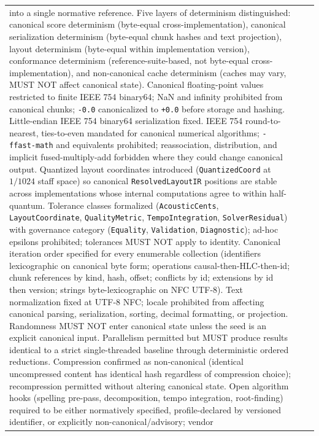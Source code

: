 \documentclass[11pt,letterpaper]{report}
\begin{document}
\begin{longtable}{p{2cm} p{2.5cm} p{9cm}}
  into a single normative reference. Five layers of determinism
  distinguished: canonical score determinism (byte-equal
  cross-implementation), canonical serialization determinism
  (byte-equal chunk hashes and text projection), layout
  determinism (byte-equal within implementation version),
  conformance determinism (reference-suite-based, not byte-equal
  cross-implementation), and non-canonical cache determinism
  (caches may vary, MUST NOT affect canonical state). Canonical
  floating-point values restricted to finite IEEE 754 binary64;
  NaN and infinity prohibited from canonical chunks;
  \texttt{-0.0} canonicalized to \texttt{+0.0} before storage and
  hashing. Little-endian IEEE 754 binary64 serialization fixed.
  IEEE 754 round-to-nearest, ties-to-even mandated for canonical
  numerical algorithms; \texttt{-ffast-math} and equivalents
  prohibited; reassociation, distribution, and implicit
  fused-multiply-add forbidden where they could change canonical
  output. Quantized layout coordinates introduced
  (\texttt{QuantizedCoord} at $1/1024$ staff space) so canonical
  \texttt{ResolvedLayoutIR} positions are stable across
  implementations whose internal computations agree to within
  half-quantum. Tolerance classes formalized
  (\texttt{AcousticCents}, \texttt{LayoutCoordinate},
  \texttt{QualityMetric}, \texttt{TempoIntegration},
  \texttt{SolverResidual}) with governance category
  (\texttt{Equality}, \texttt{Validation}, \texttt{Diagnostic});
  ad-hoc epsilons prohibited; tolerances MUST NOT apply to
  identity. Canonical iteration order specified for every
  enumerable collection (identifiers lexicographic on canonical
  byte form; operations causal-then-HLC-then-id; chunk references
  by kind, hash, offset; conflicts by id; extensions by id then
  version; strings byte-lexicographic on NFC UTF-8). Text
  normalization fixed at UTF-8 NFC; locale prohibited from
  affecting canonical parsing, serialization, sorting, decimal
  formatting, or projection. Randomness MUST NOT enter canonical
  state unless the seed is an explicit canonical input.
  Parallelism permitted but MUST produce results identical to a
  strict single-threaded baseline through deterministic ordered
  reductions. Compression confirmed as non-canonical (identical
  uncompressed content has identical hash regardless of
  compression choice); recompression permitted without altering
  canonical state. Open algorithm hooks (spelling pre-pass,
  decomposition, tempo integration, root-finding) required to be
  either normatively specified, profile-declared by versioned
  identifier, or explicitly non-canonical/advisory; vendor

\end{longtable}
\end{document}

